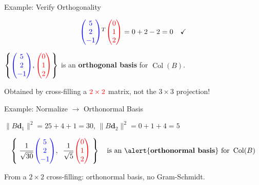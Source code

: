 \documentclass[10pt]{beamer}
\theoremstyle{definition}
\newcommand{\x}[1]{\alert{\textbf{#1}}}
\newcommand{\rd}[1]{{\color{red}#1}}                  %
\newcommand{\bl}[1]{{\color{blue}#1}}                 %
\begin{document}
\begin{frame}{Example: Verify Orthogonality}

$$\bl{\begin{pmatrix} 5 \\ 2 \\ -1 \end{pmatrix}}^T \rd{\begin{pmatrix} 0 \\ 1 \\ 2 \end{pmatrix}} = 0 + 2 - 2 = 0 \quad \checkmark$$

\vspace{0.5em}

$\left\{\bl{\begin{pmatrix} 5 \\ 2 \\ -1 \end{pmatrix}}, \rd{\begin{pmatrix} 0 \\ 1 \\ 2 \end{pmatrix}}\right\}$ is an \x{orthogonal basis} for $\operatorname{Col}(B)$.

\vspace{0.5em}

Obtained by cross-filling a $\rd{2 \times 2}$ matrix, not the $3 \times 3$ projection!

\end{frame}


\begin{frame}{Example: Normalize $\to$ Orthonormal Basis}

$\|B\mathbf{d}_1\|^2 = 25 + 4 + 1 = 30$, \quad $\|B\mathbf{d}_2\|^2 = 0 + 1 + 4 = 5$

\vspace{0.5em}

$$\left\{\;\frac{1}{\sqrt{30}}\bl{\begin{pmatrix} 5 \\ 2 \\ -1 \end{pmatrix}}, \;\; \frac{1}{\sqrt{5}}\rd{\begin{pmatrix} 0 \\ 1 \\ 2 \end{pmatrix}}\;\right\} \quad \text{is an \x{orthonormal basis} for } \operatorname{Col}(B)$$

\vspace{0.5em}

From a $2 \times 2$ cross-filling: orthonormal basis, no Gram-Schmidt.

\end{frame}
\end{document}
